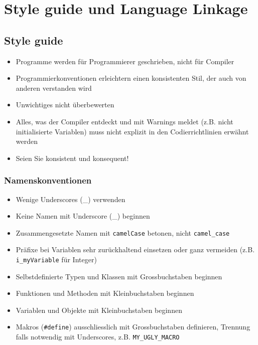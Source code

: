 \section{Style guide und Language Linkage}
\subsection{Style guide}
\begin{itemize}
	\item Programme werden für Programmierer geschrieben, nicht für Compiler
	\item Programmierkonventionen erleichtern einen konsistenten Stil, der auch von anderen verstanden wird
	\item Unwichtiges nicht überbewerten
	\item Alles, was der Compiler entdeckt und mit Warnings meldet (z.B. nicht initialisierte Variablen) muss nicht explizit in den Codierrichtlinien erwähnt werden
	\item Seien Sie konsistent und konsequent!
\end{itemize}

\subsubsection{Namenskonventionen}
\begin{itemize}
	\item Wenige Underscores (\_) verwenden
	\item Keine Namen mit Underscore (\_) beginnen
	\item Zusammengesetzte Namen mit \lstinline{camelCase} betonen, nicht \lstinline{camel_case}
	\item Präfixe bei Variablen sehr zurückhaltend einsetzen oder ganz vermeiden (z.B. \lstinline{i_myVariable} für Integer)
	\item Selbstdefinierte Typen und Klassen mit Grossbuchstaben beginnen
	\item Funktionen und Methoden mit Kleinbuchstaben beginnen
	\item Variablen und Objekte mit Kleinbuchstaben beginnen
	\item Makros (\lstinline{#define}) ausschliesslich mit Grossbuchstaben definieren, Trennung falls notwendig mit Underscores, z.B. \lstinline{MY_UGLY_MACRO}
\end{itemize}

